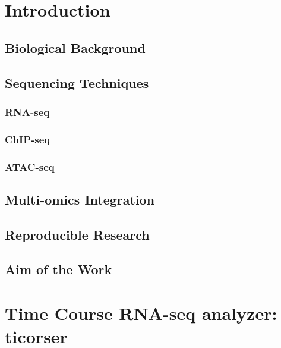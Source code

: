 \documentclass[b5paper, oneside, british, intoc, bibliograph=totoc, index=totoc, BCOR10mm, twoside, openright]{book}
\numberwithin{equation}{section}
\numberwithin{figure}{section}
\begin{document}

%
\newpage
{}

\chapter{Introduction}

\section{Biological Background}

\section{Sequencing Techniques}\label{sec:seqs}

\subsection{RNA-seq} \label{sec:rnaseq}

\subsection{ChIP-seq} \label{sec:chipseq}

\subsection{ATAC-seq} \label{sec:atacseq}

\section{Multi-omics Integration} \label{sec:integration}

\section{Reproducible Research} \label{sec:reprres}

\section{Aim of the Work} \label{sec:reprres}



\chapter{Time Course RNA-seq analyzer: ticorser} \label{sec:ticorsercap}

\end{document}
